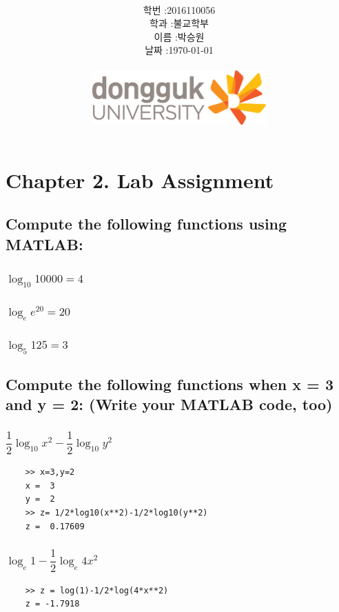 \documentclass[12pt,a4paper]{article}
\title{
	\centering
	\pgfornament[width=12cm,color=teal]{84}\\
	\vspace{1cm}
	\fontsize{50}{50} \selectfont {정보통신 수학 및 실습\\Lab assignment}\\
		\pgfornament[width=12cm,color=teal]{88}\\
	\vfill}
\author{
	\LARGE
	\begin{tabular}{rl}
		\hline
		학번 : & 2016110056\\ 
		학과 : & 불교학부 \\
		이름 : & 박승원\\
		날짜 : & \today\\
		\hline
	\end{tabular}\vspace{1cm}
	\\
\includegraphics[width=0.5\textwidth]{logo.jpg}
	}
\date{}
\begin{document}
\maketitle
{}
\noindent
\lstset{language=matlab, columns=flexible, tabsize=4, frame=shadowbox, showstringspaces=false, breaklines=true, upquote=true, basicstyle=\normalsize}

\renewcommand{\thesubsubsection}{\alph{subsubsection})}
\renewcommand{\thesubsection}{\arabic{subsection}.}
\newpage
\section*{Chapter 2. Lab Assignment}
\subsection{Compute the following functions using MATLAB:} 

\subsubsection{$\log_{10}{10000}=4$}

\subsubsection{$\log_e{e^{20}}=20$}
\subsubsection{$\log_{5}{125}=3$}

\subsection{Compute the following functions when x = 3 and y = 2: (Write your MATLAB code, too)} 

\subsubsection{$\dfrac{1}{2}\log_{10}x^2-\dfrac{1}{2}\log_{10}y^2$}
\begin{lstlisting}
	>> x=3,y=2
	x =  3
	y =  2
	>> z= 1/2*log10(x**2)-1/2*log10(y**2)
	z =  0.17609
\end{lstlisting}
\subsubsection{$\log_e1-\dfrac{1}{2}\log_e4x^2$}
\begin{lstlisting}
	>> z = log(1)-1/2*log(4*x**2)
	z = -1.7918
\end{lstlisting}
\end{document}
